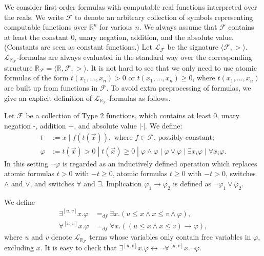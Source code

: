 \documentclass[envcountsect]{llncs}
\newcommand{\lrf}{\mathcal{L}_{\mathbb{R}_{\mathcal{F}}}}
\begin{document}
We consider first-order formulas with computable real functions interpreted
over the reals. We write $\mathcal{F}$ to denote an arbitrary collection of
symbols representing computable functions over $\mathbb{R}^n$ for various
$n$. We always assume that $\mathcal{F}$ contains at least the constant $0$,
unary negation, addition, and the absolute value. (Constants are seen as
constant functions.) Let $\mathcal{L_{\mathcal{F}}}$ be the signature $\langle
\mathcal{F}, >\rangle$. $\lrf$-formulas are always
evaluated in the standard way over the corresponding structure
$\mathbb{R}_{\mathcal{F}}= \langle \mathbb{R}, \mathcal{F}, >\rangle$.  It is
not hard to see that we only need to use atomic formulas of the form
$t(x_1,...,x_n)>0$ or $t(x_1,...,x_n)\geq 0$, where $t(x_1,...,x_n)$ are built
up from functions in $\mathcal{F}$. To avoid extra preprocessing of formulas, we
give an explicit definition of $\lrf$-formulas as follows.
\begin{definition}[$\lrf$-Formulas]
Let $\mathcal{F}$ be a collection of Type 2 functions, which contains at least
$0$, unary negation -, addition $+$, and absolute value $|\cdot|$. We define:
\begin{align*}
t& := x \; | \; f(t(\vec x)), \mbox{ where }f\in \mathcal{F}\mbox{, possibly
constant};\\
\varphi& := t(\vec x)> 0 \; | \; t(\vec x)\geq 0 \; | \; \varphi\wedge\varphi
\; | \; \varphi\vee\varphi \; | \; \exists x_i\varphi \; |\; \forall x_i\varphi.
\end{align*}
In this setting $\neg\varphi$ is regarded as an inductively defined operation
which replaces atomic formulas $t>0$ with $-t\geq 0$, atomic formulas $t\geq 0$
with $-t>0$, switches $\wedge$ and $\vee$, and switches $\forall$ and $\exists$.
Implication $\varphi_1\rightarrow\varphi_2$ is defined as
$\neg\varphi_1\vee\varphi_2$.
\end{definition}
\begin{definition}
We define
\begin{align*}
\exists^{[u,v]}x.\varphi &=_{df}\exists x. ( u \leq x \land x \leq v \wedge
\varphi),\\
\forall^{[u,v]}x.\varphi &=_{df} \forall x. ( (u \leq x \land x \leq v)
\rightarrow \varphi),
\end{align*}
where $u$ and $v$ denote $\lrf$ terms whose variables only
contain free variables in $\varphi$, excluding $x$. It is easy to check that
$\exists^{[u,v]}x. \varphi \leftrightarrow \neg \forall^{[u,v]}x. \neg\varphi$.
\end{definition}
\end{document}
